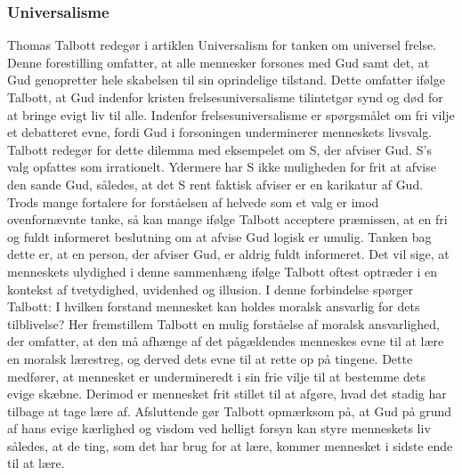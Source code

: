 \subsubsection{Universalisme}
Thomas Talbott redegør i artiklen Universalism for tanken om universel frelse. Denne forestilling omfatter, at alle mennesker forsones med Gud samt det, at Gud genopretter hele skabelsen til sin oprindelige tilstand. Dette omfatter ifølge Talbott, at Gud indenfor kristen frelsesuniversalisme tilintetgør synd og død for at bringe evigt liv til alle. Indenfor frelsesuniversalisme er spørgsmålet om fri vilje et debatteret evne, fordi Gud i forsoningen underminerer menneskets livsvalg.  Talbott redegør for dette dilemma med eksempelet om S, der afviser Gud. S’s valg opfattes som irrationelt. Ydermere har S ikke muligheden for frit at afvise den sande Gud, således, at det S rent faktisk afviser er en karikatur af Gud. Trods mange fortalere for forståelsen af helvede som et valg er imod ovenfornævnte tanke, så kan mange ifølge Talbott acceptere præmissen, at en fri og fuldt informeret beslutning om at afvise Gud logisk er umulig. Tanken bag dette er, at en person, der afviser Gud, er aldrig fuldt informeret.  Det vil sige, at menneskets ulydighed i denne sammenhæng ifølge Talbott oftest optræder i en kontekst af tvetydighed, uvidenhed og illusion. I denne forbindelse spørger Talbott:  I hvilken forstand  mennesket kan holdes moralsk ansvarlig for dets tilblivelse? Her fremstillem Talbott en mulig forståelse af moralsk ansvarlighed, der omfatter, at den må afhænge af det pågældendes menneskes evne til at lære en moralsk lærestreg, og derved dets evne til at rette op på tingene. Dette medfører, at mennesket er undermineredt i sin frie vilje til at bestemme dets evige skæbne. Derimod er mennesket frit stillet til at afgøre, hvad det stadig har tilbage at tage lære af.  Afsluttende gør Talbott opmærksom på, at Gud på grund af hans evige kærlighed og visdom ved helligt forsyn kan styre menneskets liv således, at de ting, som det har brug for at lære, kommer mennesket i sidste ende til at lære.

